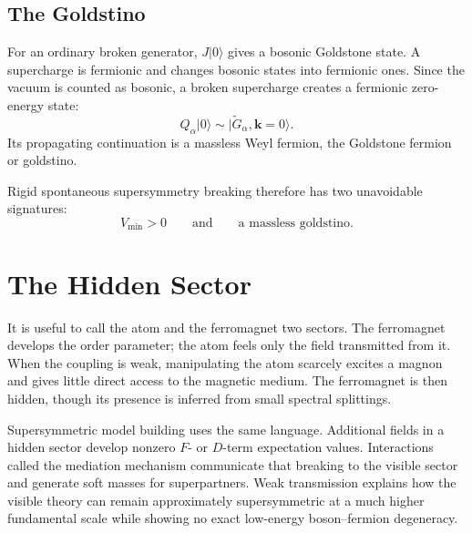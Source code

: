 \subsection{The Goldstino}

For an ordinary broken generator, \(J|0\rangle\) gives a bosonic Goldstone state. A supercharge is fermionic and changes bosonic states into fermionic ones. Since the vacuum is counted as bosonic, a broken supercharge creates a fermionic zero-energy state:
\begin{equation}
Q_\alpha|0\rangle
\sim
|\widetilde G_\alpha,\mathbf k=0\rangle.
\label{eq:l9-goldstino}
\end{equation}
Its propagating continuation is a massless Weyl fermion, the Goldstone fermion or goldstino.

\begin{classroomqa}
\end{classroomqa}

Rigid spontaneous supersymmetry breaking therefore has two unavoidable signatures:
\begin{equation}
\boxed{
V_{\min}>0
\qquad\text{and}\qquad
\text{a massless goldstino}.
}
\label{eq:l9-rigid-breaking-signatures}
\end{equation}

\section{The Hidden Sector}

It is useful to call the atom and the ferromagnet two sectors. The ferromagnet develops the order parameter; the atom feels only the field transmitted from it. When the coupling is weak, manipulating the atom scarcely excites a magnon and gives little direct access to the magnetic medium. The ferromagnet is then hidden, though its presence is inferred from small spectral splittings.

Supersymmetric model building uses the same language. Additional fields in a hidden sector develop nonzero \(F\)- or \(D\)-term expectation values. Interactions called the mediation mechanism communicate that breaking to the visible sector and generate soft masses for superpartners. Weak transmission explains how the visible theory can remain approximately supersymmetric at a much higher fundamental scale while showing no exact low-energy boson--fermion degeneracy.

